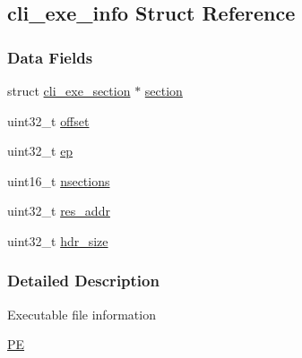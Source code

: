 \hypertarget{structcli__exe__info}{
\subsection{cli\_\-exe\_\-info Struct Reference}
\label{structcli__exe__info}
}
\subsubsection*{Data Fields}
\begin{DoxyCompactItemize}
\item 
struct \hyperlink{structcli__exe__section}{cli\_\-exe\_\-section} $\ast$ \hyperlink{structcli__exe__info_a1c449c2a02971006b72d8ab755684716}{section}
\item 
uint32\_\-t \hyperlink{structcli__exe__info_a894bdfa2d603d8343f8ef01dda6fcd23}{offset}
\item 
uint32\_\-t \hyperlink{structcli__exe__info_afaed4671662028c061ab84eefcce0546}{ep}
\item 
uint16\_\-t \hyperlink{structcli__exe__info_aa4af5e526457df524fc9a4ba46803a70}{nsections}
\item 
uint32\_\-t \hyperlink{structcli__exe__info_ac0f1b36bb8a1eeb981958dc4643f67dd}{res\_\-addr}
\item 
uint32\_\-t \hyperlink{structcli__exe__info_af2492dd421362ffced98eb583964b310}{hdr\_\-size}
\end{DoxyCompactItemize}


\subsubsection{Detailed Description}
Executable file information \begin{Desc}
\item[\hyperlink{pe__pe000004}{PE}]\end{Desc}


